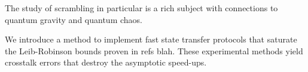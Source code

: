 


The study of scrambling in particular is a rich subject with connections to quantum gravity and quantum chaos.







We introduce a method to implement fast state transfer protocols that saturate the Leib-Robinson bounds proven in refs {blah}. These experimental methods yield crosstalk errors that destroy the asymptotic speed-ups.
